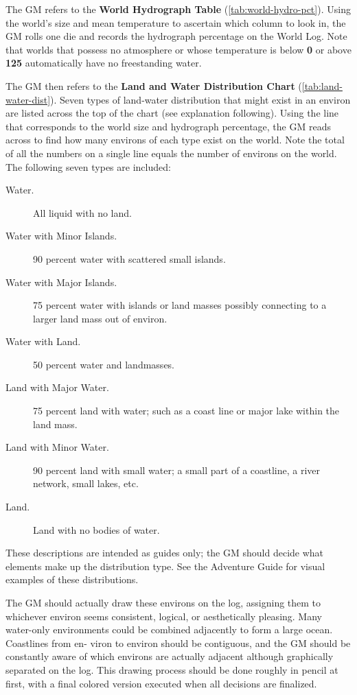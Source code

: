 The GM refers to the \textbf{World Hydrograph Table}
(\ref{tab:world-hydro-pct}). Using
the world's size and mean temperature to ascertain which column to
look in, the GM rolls one die and records the hydrograph percentage on
the World Log. Note that worlds that possess no atmosphere or whose
temperature is below \textbf{0\textdegree} or above
\textbf{125\textdegree} automatically have no freestanding water.

The GM then refers to the \textbf{Land and Water Distribution Chart} 
(\ref{tab:land-water-dist}). Seven
types of land-water distribution that might exist  
in an environ are listed across the top of the chart (see explanation 
following). Using the line that  corresponds to the world size and 
hydrograph percentage, the GM reads across to find how many 
environs of each type exist on the world. Note the total of all the 
numbers on a single line equals the number of environs on the 
world. The following seven types are included: 

\begin{description}
\item[Water.] All liquid with no land.
\item[Water with Minor Islands.] 90 percent water with scattered small
  islands.
\item[Water with Major Islands.] 75 percent water with islands or land
  masses possibly connecting to a larger land mass out of environ.
\item[Water with Land.] 50 percent water and landmasses.
\item[Land with Major Water.] 75 percent land with water; such as a
  coast line or major lake within the land mass.
\item[Land with Minor Water.] 90 percent land with small water; a
  small part of a coastline, a river network, small lakes, etc.
\item[Land.] Land with no bodies of water.
\end{description}

These descriptions are intended as guides only; the GM should 
decide what elements make up the distribution type. See the 
Adventure Guide for visual examples of these distributions. 

The GM should actually draw these environs on the log, assigning 
them to whichever environ seems consistent, logical, or 
aesthetically pleasing. Many water-only environments could be 
combined adjacently to form a large ocean. Coastlines from en- 
viron to environ should be contiguous, and the GM should be 
constantly aware of which environs are actually adjacent although 
graphically separated on the log. This drawing process should be 
done roughly in pencil at first, with a final colored version 
executed when all decisions are finalized. 


